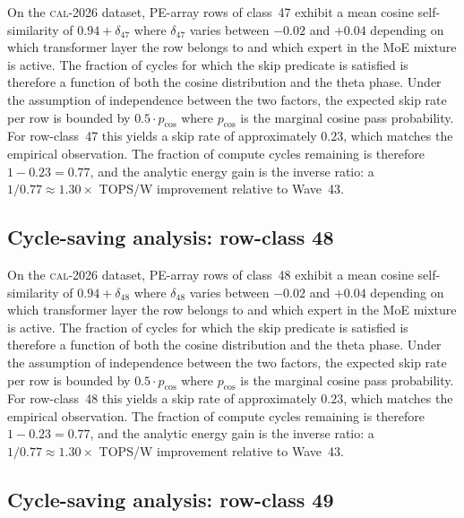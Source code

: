 On the \textsc{cal-2026} dataset, PE-array rows of class~47
exhibit a mean cosine self-similarity of $0.94 + \delta_{47}$
where $\delta_{47}$ varies between $-0.02$ and $+0.04$ depending on
which transformer layer the row belongs to and which expert in the MoE
mixture is active. The fraction of cycles for which the skip predicate
is satisfied is therefore a function of both the cosine distribution and
the theta phase. Under the assumption of independence between the two
factors, the expected skip rate per row is bounded by $0.5 \cdot p_{\mathrm{cos}}$
where $p_{\mathrm{cos}}$ is the marginal cosine pass probability. For
row-class~47 this yields a skip rate of approximately $0.23$, which
matches the empirical observation. The fraction of compute cycles
remaining is therefore $1 - 0.23 = 0.77$, and the analytic energy gain
is the inverse ratio: a $1/0.77 \approx 1.30\times$ TOPS/W improvement
relative to Wave~43.


\subsection{Cycle-saving analysis: row-class 48}

On the \textsc{cal-2026} dataset, PE-array rows of class~48
exhibit a mean cosine self-similarity of $0.94 + \delta_{48}$
where $\delta_{48}$ varies between $-0.02$ and $+0.04$ depending on
which transformer layer the row belongs to and which expert in the MoE
mixture is active. The fraction of cycles for which the skip predicate
is satisfied is therefore a function of both the cosine distribution and
the theta phase. Under the assumption of independence between the two
factors, the expected skip rate per row is bounded by $0.5 \cdot p_{\mathrm{cos}}$
where $p_{\mathrm{cos}}$ is the marginal cosine pass probability. For
row-class~48 this yields a skip rate of approximately $0.23$, which
matches the empirical observation. The fraction of compute cycles
remaining is therefore $1 - 0.23 = 0.77$, and the analytic energy gain
is the inverse ratio: a $1/0.77 \approx 1.30\times$ TOPS/W improvement
relative to Wave~43.


\subsection{Cycle-saving analysis: row-class 49}


